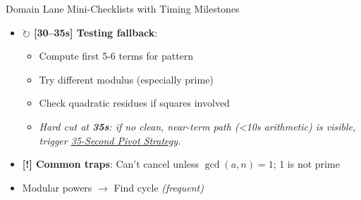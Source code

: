 \documentclass{article}
\newcommand{\timer}[1]{\textbf{\textcolor{timegreen}{#1}}}
\begin{document}
\begin{classifybox}{Domain Lane Mini-Checklists with Timing Milestones}
\begin{itemize}[nosep]
      \item \textbf{$\circlearrowright$ [30--35s] Testing fallback}:
        \begin{itemize}[nosep]
        \item Compute first 5-6 terms for pattern
        \item Try different modulus (especially prime)
        \item Check quadratic residues if squares involved
        \item \emph{Hard cut at \timer{35s}: if no clean, near-term path (<10s arithmetic) is visible, trigger \hyperlink{pivot35}{35-Second Pivot Strategy}.}
        \end{itemize}
      \item \textbf{[!] Common traps}: Can't cancel unless $\gcd(a,n)=1$; 1 is not prime
      \item {} Modular powers $\rightarrow$ Find cycle \emph{(frequent)}
      \end{itemize}
      
      \vspace{3mm}

\end{classifybox}
\end{document}
